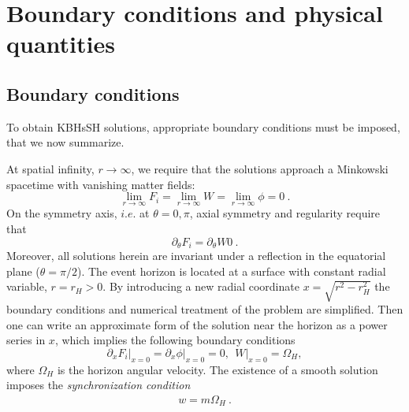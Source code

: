 \chapter{Boundary conditions and physical quantities}
\label{BCs}
\section{Boundary conditions}
\label{sec_bc}
To obtain KBHsSH solutions, appropriate boundary conditions must be imposed, that we now summarize.
  
At spatial infinity, $r\rightarrow\infty$, we require that the solutions approach a Minkowski spacetime
with vanishing matter fields:
\begin{equation}
  \lim_{r\rightarrow \infty}{F_i}=\lim_{r\rightarrow \infty}{W}=\lim_{r\rightarrow \infty}{\phi}=0\ .
\end{equation}
%
On the symmetry axis, $i.e.$ at $\theta=0,\pi$, axial symmetry and regularity require that
\begin{equation}
\partial_\theta F_i = \partial_\theta W 0\ .
\end{equation} 
%
Moreover, all solutions herein are invariant under a reflection in the equatorial plane ($\theta=\pi/2$).
The event horizon is located at a surface with constant radial variable, $r=r_H>0$.
By introducing a new radial coordinate $x=\sqrt{r^2-r_H^2}$ 
the boundary conditions and numerical treatment of the problem are simplified.
Then one can write an approximate form of the solution  near the horizon as a power series in $x$,
which implies the following boundary conditions
\begin{equation}
\partial_x F_i \big|_{x=0}= \partial_x \phi  \big|_{x=0} =  0,~~W \big|_{x=0}=\Omega_H,
\label{bch1}
\end{equation}
where $\Omega_H $ is the horizon angular velocity.
The existence of a smooth solution imposes the
\textit{synchronization condition}
%
\begin{eqnarray}
\label{KNcond}
w=m\Omega_H\ .
\end{eqnarray}
%
 


